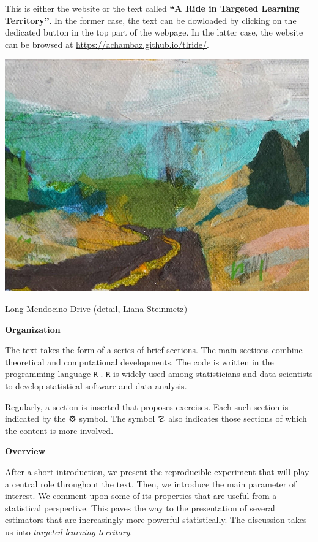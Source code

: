 \documentclass[
  11pt,
  openright,twoside]{book}
\newcommand{\gear}{\usebox{\gearbox}\;}
\DeclareRobustCommand{\stixdanger}{%
  {\usefont{U}{stixbbit}{m}{it}\symbol{"F6}}%
}
\theoremstyle{definition}
\theoremstyle{definition}
\theoremstyle{definition}
\theoremstyle{definition}
\theoremstyle{remark}
\begin{document}
This is either the website or the text called \textbf{``A Ride in Targeted Learning
Territory''}. In the former case, the text can be dowloaded by clicking on the
dedicated button in the top part of the webpage. In the latter case, the
website can be browsed at
\url{https://achambaz.github.io/tlride/}.

\begin{center}\includegraphics[width=0.7\linewidth]{cover} \end{center}

\begin{center}
Long Mendocino Drive (detail,
\href{https://www.lianasteinmetz.com/}{Liana Steinmetz})
\end{center}

\textbf{Organization}

The text takes the form of a series of brief sections. The main sections
combine theoretical and computational developments. The code is written in the
programming language \href{https://www.r-project.org}{\texttt{R}} \citep{R}. \texttt{R} is widely
used among statisticians and data scientists to develop statistical software
and data analysis.

Regularly, a section is inserted that proposes exercises. Each such section
is indicated by the {⚙} \gear symbol. The
symbol {☡} \stixdanger{} also indicates
those sections of which the content is more involved.

\textbf{Overview}

After a short introduction, we present the reproducible experiment that will
play a central role throughout the text. Then, we introduce the main parameter
of interest. We comment upon some of its properties that are useful from a
statistical perspective. This paves the way to the presentation of several
estimators that are increasingly more powerful statistically. The discussion
takes us into \emph{targeted learning territory}.
\end{document}
